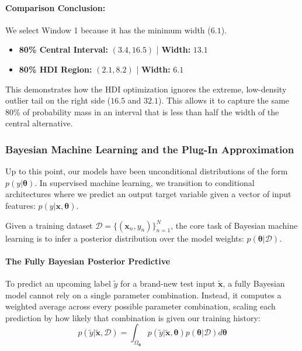 \documentclass{article}
\begin{document}
\paragraph{Comparison Conclusion:}
We select Window 1 because it has the minimum width ($6.1$). 
\begin{itemize}
    \item \textbf{80\% Central Interval:} $(3.4, 16.5)$ | \textbf{Width:} $13.1$
    \item \textbf{80\% HDI Region:} $(2.1, 8.2)$ | \textbf{Width:} $6.1$
\end{itemize}
This demonstrates how the HDI optimization ignores the extreme, low-density outlier tail on the right side ($16.5$ and $32.1$). This allows it to capture the same 80\% of probability mass in an interval that is less than half the width of the central alternative.

\subsubsection{Bayesian Machine Learning and the Plug-In Approximation}
Up to this point, our models have been unconditional distributions of the form $p(y|\boldsymbol{\theta})$. In supervised machine learning, we transition to conditional architectures where we predict an output target variable given a vector of input features: $p(y|\mathbf{x}, \boldsymbol{\theta})$.

Given a training dataset $\mathcal{D} = \{(\mathbf{x}_n, y_n)\}_{n=1}^N$, the core task of Bayesian machine learning is to infer a posterior distribution over the model weights: $p(\boldsymbol{\theta}|\mathcal{D})$.

\paragraph{The Fully Bayesian Posterior Predictive}
To predict an upcoming label $\tilde{y}$ for a brand-new test input $\tilde{\mathbf{x}}$, a fully Bayesian model cannot rely on a single parameter combination. Instead, it computes a weighted average across every possible parameter combination, scaling each prediction by how likely that combination is given our training history:
\begin{equation}
p(\tilde{y}|\tilde{\mathbf{x}}, \mathcal{D}) = \int_{\Omega_{\boldsymbol{\theta}}} p(\tilde{y}|\tilde{\mathbf{x}}, \boldsymbol{\theta}) p(\boldsymbol{\theta}|\mathcal{D}) d\boldsymbol{\theta}
\end{equation}
\end{document}

